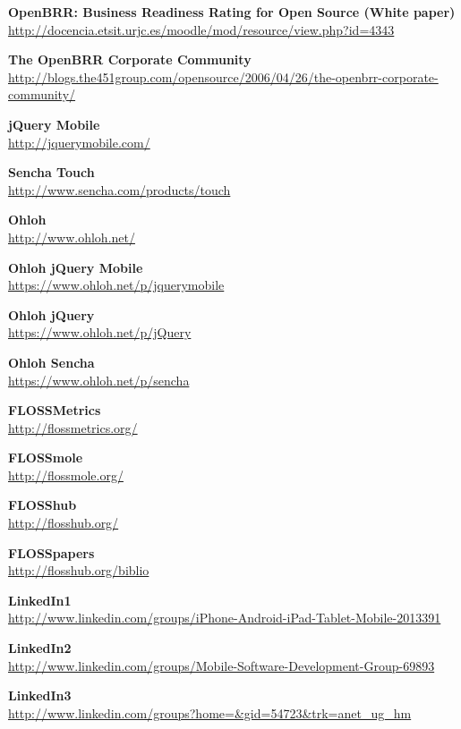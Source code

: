\documentclass[a4paper,12pt]{book}
\begin{document}
\begin{thebibliography}{25}
 

\textbf{OpenBRR: Business Readiness Rating for
Open Source (White paper)}\\
{\footnotesize\url{
http://docencia.etsit.urjc.es/moodle/mod/resource/view.php?id=4343}}

\textbf{The OpenBRR Corporate Community}\\
{\footnotesize\url{http://blogs.the451group.com/opensource/2006/04/26/the-openbrr-corporate-community/}}

\textbf{jQuery Mobile}\\
{\footnotesize\url{http://jquerymobile.com/}}

\textbf{Sencha Touch}\\
{\footnotesize\url{http://www.sencha.com/products/touch}}

\textbf{Ohloh}\\
{\footnotesize\url{http://www.ohloh.net/}}

\textbf{Ohloh jQuery Mobile}\\
{\footnotesize\url{https://www.ohloh.net/p/jquerymobile}}

\textbf{Ohloh jQuery}\\
{\footnotesize\url{https://www.ohloh.net/p/jQuery}}

\textbf{Ohloh Sencha}\\
{\footnotesize\url{https://www.ohloh.net/p/sencha}}

\textbf{FLOSSMetrics}\\
{\footnotesize\url{http://flossmetrics.org/}}

\textbf{FLOSSmole}\\
{\footnotesize\url{http://flossmole.org/}}

\textbf{FLOSShub}\\
{\footnotesize\url{http://flosshub.org/}}

\textbf{FLOSSpapers}\\
{\footnotesize\url{http://flosshub.org/biblio}}

\textbf{LinkedIn1}\\
{\footnotesize\url{http://www.linkedin.com/groups/iPhone-Android-iPad-Tablet-Mobile-2013391}}

\textbf{LinkedIn2}\\
{\footnotesize\url{http://www.linkedin.com/groups/Mobile-Software-Development-Group-69893}}

\textbf{LinkedIn3}\\
{\footnotesize\url{http://www.linkedin.com/groups?home=&gid=54723&trk=anet_ug_hm}}


\end{thebibliography}
\end{document}
